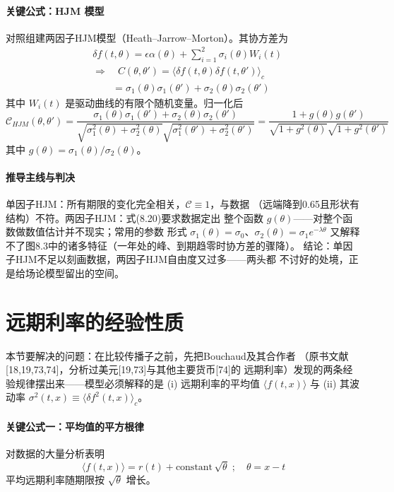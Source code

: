 \paragraph{关键公式：HJM 模型}
对照组建两因子HJM模型（Heath--Jarrow--Morton）。其协方差为
\begin{align*}
&\delta f(t,\theta)=\epsilon\alpha(\theta)+\sum_{i=1}^{2}\sigma_{i}(\theta)W_{i}(t)\\
&\Rightarrow\quad C(\theta,\theta')=\langle\delta f(t,\theta)\delta f(t,\theta')\rangle_c\\
&\qquad=\sigma_{1}(\theta)\sigma_{1}(\theta')+\sigma_{2}(\theta)\sigma_{2}(\theta')
\tag{8.19}
\end{align*}
其中 $W_i(t)$ 是驱动曲线的有限个随机变量。归一化后
\begin{equation*}
\mathcal{C}_{HJM}(\theta,\theta')=
\frac{\sigma_{1}(\theta)\sigma_{1}(\theta')+\sigma_{2}(\theta)\sigma_{2}(\theta')}
{\sqrt{\sigma_{1}^{2}(\theta)+\sigma_{2}^{2}(\theta)}
\sqrt{\sigma_{1}^{2}(\theta')+\sigma_{2}^{2}(\theta')}}
=\frac{1+g(\theta)g(\theta')}{\sqrt{1+g^{2}(\theta)}\sqrt{1+g^{2}(\theta')}}
\tag{8.20}
\end{equation*}
其中 $g(\theta)=\sigma_{1}(\theta)/\sigma_{2}(\theta)$。

\paragraph{推导主线与判决}
单因子HJM：所有期限的变化完全相关，$\mathcal{C}\equiv1$，与数据
（远端降到0.65且形状有结构）不符。两因子HJM：式(8.20)要求数据定出
整个函数 $g(\theta)$——对整个函数做数值估计并不现实；常用的参数
形式 $\sigma_{1}(\theta)=\sigma_{0}$、$\sigma_{2}(\theta)=\sigma_{1}e^{-\lambda\theta}$
又解释不了图8.3中的诸多特征（一年处的峰、到期趋零时协方差的骤降）。
结论：单因子HJM不足以刻画数据，两因子HJM自由度又过多——两头都
不讨好的处境，正是给场论模型留出的空间。

\section{远期利率的经验性质}

本节要解决的问题：在比较传播子之前，先把Bouchaud及其合作者
（原书文献[18,19,73,74]，分析过美元[19,73]与其他主要货币[74]的
远期利率）发现的两条经验规律摆出来——模型必须解释的是
(i) 远期利率的平均值 $\langle f(t,x)\rangle$ 与 (ii) 其波动率
$\sigma^{2}(t,x)\equiv\langle\delta f^{2}(t,x)\rangle_c$。

\paragraph{关键公式一：平均值的平方根律}
对数据的大量分析表明
\begin{equation*}
\langle f(t,x)\rangle=r(t)+\text{constant}\,\sqrt{\theta}\;;\quad
\theta=x-t
\tag{8.21}
\end{equation*}
平均远期利率随期限按 $\sqrt{\theta}$ 增长。

